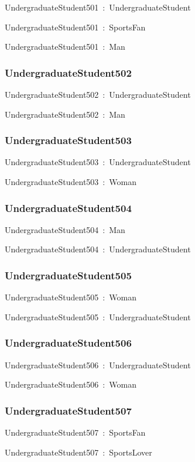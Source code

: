 \documentclass{article}
\begin{document}
UndergraduateStudent501~:~UndergraduateStudent

UndergraduateStudent501~:~SportsFan

UndergraduateStudent501~:~Man

\subsubsection*{UndergraduateStudent502}

UndergraduateStudent502~:~UndergraduateStudent

UndergraduateStudent502~:~Man

\subsubsection*{UndergraduateStudent503}

UndergraduateStudent503~:~UndergraduateStudent

UndergraduateStudent503~:~Woman

\subsubsection*{UndergraduateStudent504}

UndergraduateStudent504~:~Man

UndergraduateStudent504~:~UndergraduateStudent

\subsubsection*{UndergraduateStudent505}

UndergraduateStudent505~:~Woman

UndergraduateStudent505~:~UndergraduateStudent

\subsubsection*{UndergraduateStudent506}

UndergraduateStudent506~:~UndergraduateStudent

UndergraduateStudent506~:~Woman

\subsubsection*{UndergraduateStudent507}

UndergraduateStudent507~:~SportsFan

UndergraduateStudent507~:~SportsLover
\end{document}

